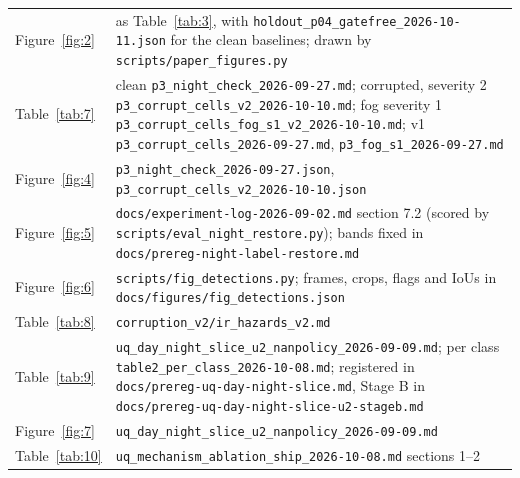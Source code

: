 \documentclass[10pt]{article}
\begin{document}
\begin{table}[htbp]
\begin{tabularx}{\linewidth}{l>{\raggedright\arraybackslash}X}
Figure~\ref{fig:2} & as Table~\ref{tab:3}, with \texttt{holdout\_\allowbreak{}p04\_\allowbreak{}gatefree\_\allowbreak{}2026-10-11.json} for the clean baselines; drawn by \texttt{scripts/\allowbreak{}paper\_\allowbreak{}figures.py} \\
Table~\ref{tab:7} & clean \texttt{p3\_\allowbreak{}night\_\allowbreak{}check\_\allowbreak{}2026-09-27.md}; corrupted, severity 2 \texttt{p3\_\allowbreak{}corrupt\_\allowbreak{}cells\_\allowbreak{}v2\_\allowbreak{}2026-10-10.md}; fog severity 1 \texttt{p3\_\allowbreak{}corrupt\_\allowbreak{}cells\_\allowbreak{}fog\_\allowbreak{}s1\_\allowbreak{}v2\_\allowbreak{}2026-10-10.md}; v1 \texttt{p3\_\allowbreak{}corrupt\_\allowbreak{}cells\_\allowbreak{}2026-09-27.md}, \texttt{p3\_\allowbreak{}fog\_\allowbreak{}s1\_\allowbreak{}2026-09-27.md} \\
Figure~\ref{fig:4} & \texttt{p3\_\allowbreak{}night\_\allowbreak{}check\_\allowbreak{}2026-09-27.json}, \texttt{p3\_\allowbreak{}corrupt\_\allowbreak{}cells\_\allowbreak{}v2\_\allowbreak{}2026-10-10.json} \\
Figure~\ref{fig:5} & \texttt{docs/\allowbreak{}experiment-log-2026-09-02.md} section 7.2 (scored by \texttt{scripts/\allowbreak{}eval\_\allowbreak{}night\_\allowbreak{}restore.py}); bands fixed in \texttt{docs/\allowbreak{}prereg-night-label-restore.md} \\
Figure~\ref{fig:6} & \texttt{scripts/\allowbreak{}fig\_\allowbreak{}detections.py}; frames, crops, flags and IoUs in \texttt{docs/\allowbreak{}figures/\allowbreak{}fig\_\allowbreak{}detections.json} \\
Table~\ref{tab:8} & \texttt{corruption\_\allowbreak{}v2/\allowbreak{}ir\_\allowbreak{}hazards\_\allowbreak{}v2.md} \\
Table~\ref{tab:9} & \texttt{uq\_\allowbreak{}day\_\allowbreak{}night\_\allowbreak{}slice\_\allowbreak{}u2\_\allowbreak{}nanpolicy\_\allowbreak{}2026-09-09.md}; per class \texttt{table2\_\allowbreak{}per\_\allowbreak{}class\_\allowbreak{}2026-10-08.md}; registered in \texttt{docs/\allowbreak{}prereg-uq-day-night-slice.md}, Stage B in \texttt{docs/\allowbreak{}prereg-uq-day-night-slice-u2-stageb.md} \\
Figure~\ref{fig:7} & \texttt{uq\_\allowbreak{}day\_\allowbreak{}night\_\allowbreak{}slice\_\allowbreak{}u2\_\allowbreak{}nanpolicy\_\allowbreak{}2026-09-09.md} \\
Table~\ref{tab:10} & \texttt{uq\_\allowbreak{}mechanism\_\allowbreak{}ablation\_\allowbreak{}ship\_\allowbreak{}2026-10-08.md} sections 1--2 \\

\end{tabularx}
\end{table}
\end{document}
